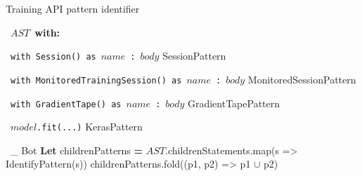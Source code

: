 
%     
% 

\begin{algorithm}
\caption{Training API pattern identifier}\label{tapa}
  \begin{algorithmic}[1]
    \Match~$AST$~\textbf{with:}

      \Case~{\tt with Session() as}~$name$~{\tt :}~$body$
          SessionPattern
        \EndIf
      \EndCase

      \Case~{\tt with MonitoredTrainingSession() as}~$name$~{\tt :}~$body$
          MonitoredSessionPattern
        \EndIf
      \EndCase

      \Case~{\tt with GradientTape() as}~$name$~{\tt :}~$body$
          GradientTapePattern
        \EndIf
      \EndCase

      \Case~$model${\tt.fit(...)}
          KerasPattern
        \EndIf
      \EndCase

      \Case~\_
          Bot 
        \Else
          \State \textbf{Let} childrenPatterns \textbf{=} $AST$.childrenStatements.map(s => IdentifyPattern(s))
          \State childrenPatterns.fold((p1, p2) => p1 $\cup$ p2) 
        \EndIf
      \EndCase

    \EndMatch
    \EndFunction
  \end{algorithmic}
\end{algorithm}

